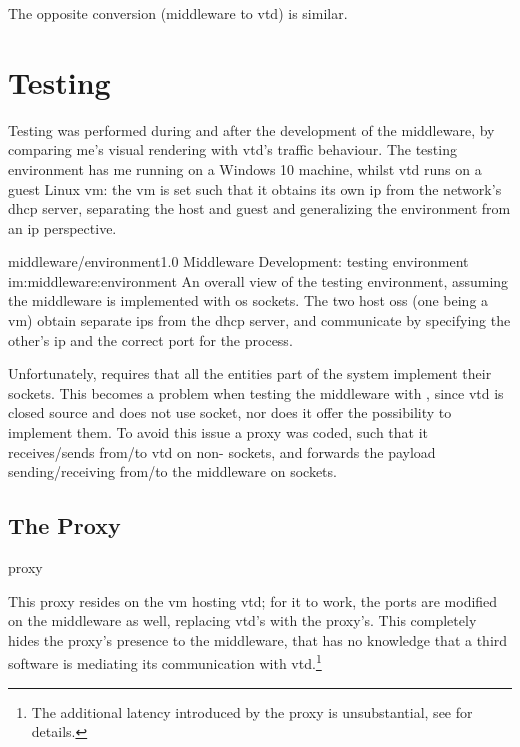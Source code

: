 The opposite conversion (\gls{middleware} to \gls{vtd}) is similar.

\section{Testing}\label{sc:middleware:testing}

Testing was performed during and after the development of the \gls{middleware}, by comparing \gls{me}'s visual rendering with \gls{vtd}'s traffic behaviour. The testing environment has \gls{me} running on a Windows 10 machine, whilst \gls{vtd} runs on a guest Linux \gls{vm}: the \gls{vm} is set such that it obtains its own \gls{ip} from the network's \gls{dhcp} server, separating the host and guest and generalizing the environment from an \gls{ip} perspective.

\begin{image}
	{middleware/environment}{1.0}
	{Middleware Development: testing environment}
	{im:middleware:environment}
	{}
	{An overall view of the testing environment, assuming the \gls{middleware} is implemented with \gls{os} sockets. The two host \glspl{os} (one being a \gls{vm}) obtain separate \glspl{ip} from the \gls{dhcp} server, and communicate by specifying the other's \gls{ip} and the correct port for the process.}
\end{image}

Unfortunately,  requires that all the entities part of the system implement their sockets. This becomes a problem when testing the \gls{middleware} with , since \gls{vtd} is closed source and does not use  socket, nor does it offer the possibility to implement them. To avoid this issue a \gls{proxy} was coded, such that it receives/sends from/to \gls{vtd} on non- sockets, and forwards the \gls{payload} sending/receiving from/to the \gls{middleware} on  sockets.

\subsection{The Proxy}

\begin{definition}{proxy}
\end{definition}

This \gls{proxy} resides on the \gls{vm} hosting \gls{vtd}; for it to work, the ports are modified on the \gls{middleware} as well, replacing \gls{vtd}'s with the \gls{proxy}'s. This completely hides the \gls{proxy}'s presence to the \gls{middleware}, that has no knowledge that a third software is mediating its communication with \gls{vtd}.\footnote{The additional latency introduced by the \gls{proxy} is unsubstantial, see  for details.}

